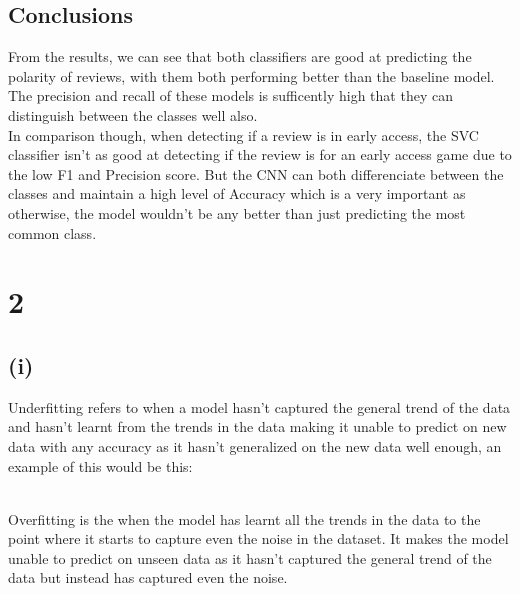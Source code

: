 \documentclass[11pt]{article} %
\begin{document}
\subsection{Conclusions}
From the results, we can see that both classifiers are good at predicting the polarity of reviews, with them both performing better than the baseline model. The precision and recall of these models is sufficently high that they can distinguish between the classes well also.
\\ In comparison though, when detecting if a review is in early access, the SVC classifier isn't as good at detecting if the review is for an early access game due to the low F1 and Precision score. But the CNN can both differenciate between the classes and maintain a high level of Accuracy which is a very important as otherwise, the model wouldn't be any better than just predicting the most common class.
\section{2}
\subsection{(i)}
Underfitting refers to when a model hasn't captured the general trend of the data and hasn't learnt from the trends in the data making it unable to predict on new data with any accuracy as it hasn't generalized on the new data well enough,  an example of this would be this:
\begin{figure}[h]
\centering
{}
\qquad
\end{figure}
\\
Overfitting is the when the model has learnt all the trends in the data to the point where it starts to capture even the noise in the dataset.  It makes the model unable to predict on unseen data as it hasn't captured the general trend of the data but instead has captured even the noise. 
\begin{figure}[h]
\centering
{}
\qquad
\end{figure}
\end{document}
